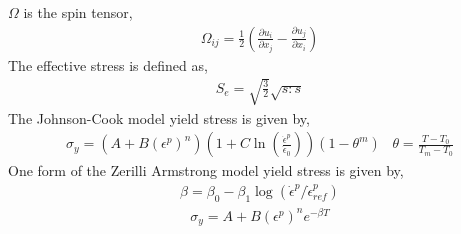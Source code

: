 \documentclass[]{article}
\begin{document}
$\Omega$ is the spin tensor,
\begin{eqnarray}
	\Omega_{ij}=\frac{1}{2}(
	\frac{\partial u_{i}}{\partial x_{j}}-
	\frac{\partial u_{j}}{\partial x_{i}})
\end{eqnarray}
The effective stress is defined as,
\begin{eqnarray}
	S_{e}=\sqrt{\frac{3}{2}}\sqrt{s:s}
\end{eqnarray}
The Johnson-Cook model yield stress is given by,
\begin{eqnarray}
	\sigma_{y}=
	(A+B(\epsilon^{p})^{n})
	(1+C\ln(
	\frac{\dot{\epsilon}^{p}}
	{\dot{\epsilon}_{0}}
	))(1-\theta^{m}) \hspace{10pt}
	\theta=\frac{T-T_{0}}{T_{m}-T_{0}}
	\label{Johnson}
\end{eqnarray}
One form of the Zerilli Armstrong model yield stress is given by,
\begin{eqnarray}
	\beta=\beta_{0}-\beta_{1}
	\log(\dot{\epsilon}^{p}/\dot{\epsilon}^{p}_{ref})
\end{eqnarray}
\begin{eqnarray}
	\sigma_{y}=A+B(\epsilon^{p})^{n}e^{-\beta T}
	\label{zerilli}
\end{eqnarray}
\end{document}
